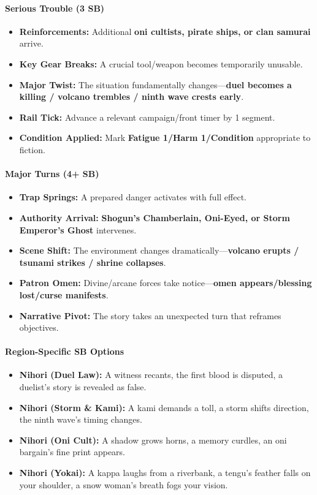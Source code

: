 \paragraph{Serious Trouble (3 SB)}
\begin{itemize}
\item \textbf{Reinforcements:} Additional \textbf{oni cultists, pirate ships, or clan samurai} arrive.
\item \textbf{Key Gear Breaks:} A crucial tool/weapon becomes temporarily unusable.
\item \textbf{Major Twist:} The situation fundamentally changes---\textbf{duel becomes a killing / volcano trembles / ninth wave crests early}.
\item \textbf{Rail Tick:} Advance a relevant campaign/front timer by 1 segment.
\item \textbf{Condition Applied:} Mark \textbf{Fatigue 1/Harm 1/Condition} appropriate to fiction.
\end{itemize}

\paragraph{Major Turns (4+ SB)}
\begin{itemize}
\item \textbf{Trap Springs:} A prepared danger activates with full effect.
\item \textbf{Authority Arrival:} \textbf{Shogun's Chamberlain, Oni-Eyed, or Storm Emperor's Ghost} intervenes.
\item \textbf{Scene Shift:} The environment changes dramatically---\textbf{volcano erupts / tsunami strikes / shrine collapses}.
\item \textbf{Patron Omen:} Divine/arcane forces take notice---\textbf{omen appears/blessing lost/curse manifests}.
\item \textbf{Narrative Pivot:} The story takes an unexpected turn that reframes objectives.
\end{itemize}

\paragraph{Region-Specific SB Options}
\begin{itemize}
\item \textbf{Nihori (Duel Law):} A witness recants, the first blood is disputed, a duelist's story is revealed as false.
\item \textbf{Nihori (Storm \& Kami):} A kami demands a toll, a storm shifts direction, the ninth wave's timing changes.
\item \textbf{Nihori (Oni Cult):} A shadow grows horns, a memory curdles, an oni bargain's fine print appears.
\item \textbf{Nihori (Yokai):} A kappa laughs from a riverbank, a tengu's feather falls on your shoulder, a snow woman's breath fogs your vision.
\end{itemize}

